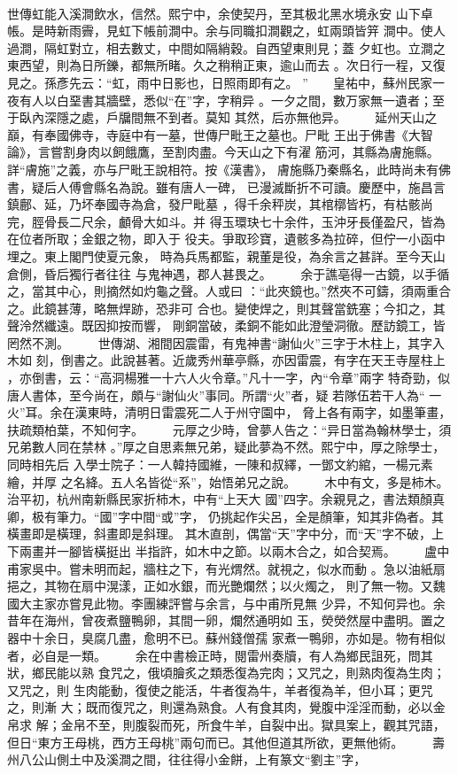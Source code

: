 \documentclass{ctexart}
\begin{document}
\paragraph{}
世傳虹能入溪澗飲水，信然。熙宁中，余使契丹，至其极北黑水境永安 山下卓帳。是時新雨霽，見虹下帳前澗中。余与同職扣澗觀之，虹兩頭皆笄 澗中。使人過澗，隔虹對立，相去數丈，中間如隔綃穀。自西望東則見；蓋 夕虹也。立澗之東西望，則為日所鑠，都無所睹。久之稍稍正東，逾山而去 。次日行一程，又復見之。孫彥先云：``虹，雨中日影也，日照雨即有之。 ''　　皇祐中，蘇州民家一夜有人以白堊書其牆壁，悉似``在''字，字稍异 。一夕之間，數万家無一遺者；至于臥內深隱之處，戶牖間無不到者。莫知 其然，后亦無他异。 　　延州天山之巔，有奉國佛寺，寺庭中有一墓，世傳尸毗王之墓也。尸毗 王出于佛書《大智論》，言嘗割身肉以飼餓鷹，至割肉盡。今天山之下有濯 筋河，其縣為膚施縣。詳``膚施''之義，亦与尸毗王說相符。按《漢書》， 膚施縣乃秦縣名，此時尚未有佛書，疑后人傅會縣名為說。雖有唐人一碑， 已漫滅斷折不可讀。慶歷中，施昌言鎮鄜、延，乃坏奉國寺為倉，發尸毗墓 ，得千余秤炭，其棺槨皆朽，有枯骸尚完，脛骨長二尺余，顱骨大如斗。并 得玉環玦七十余件，玉沖牙長僅盈尺，皆為在位者所取；金銀之物，即入于 役夫。爭取珍寶，遺骸多為拉碎，但佇一小函中埋之。東上閣門使夏元象， 時為兵馬都監，親董是役，為余言之甚詳。至今天山倉側，昏后獨行者往往 与鬼神遇，郡人甚畏之。 　　余于譙亳得一古鏡，以手循之，當其中心，則摘然如灼龜之聲。人或曰 ：``此夾鏡也。''然夾不可鑄，須兩重合之。此鏡甚薄，略無焊跡，恐非可 合也。變使焊之，則其聲當銑塞；今扣之，其聲泠然纖遠。既因抑按而響， 剛銅當破，柔銅不能如此澄瑩洞徹。歷訪鏡工，皆罔然不測。 　　世傳湖、湘間因震雷，有鬼神書``謝仙火''三字于木柱上，其字入木如 刻，倒書之。此說甚著。近歲秀州華亭縣，亦因雷震，有字在天王寺屋柱上 ，亦倒書，云：``高洞楊雅一十六人火令章。''凡十一字，內``令章''兩字 特奇勁，似唐人書体，至今尚在，頗与``謝仙火''事同。所謂``火''者，疑 若隊伍若干人為`` 一火''耳。余在漢東時，清明日雷震死二人于州守園中， 脅上各有兩字，如墨筆畫，扶疏類柏葉，不知何字。 　　元厚之少時，曾夢人告之：``异日當為翰林學士，須兄弟數人同在禁林 。''厚之自思素無兄弟，疑此夢為不然。熙宁中，厚之除學士，同時相先后 入學士院子：一人韓持國維，一陳和叔繹，一鄧文約綰，一楊元素繪，并厚 之名絳。五人名皆從``系''，始悟弟兄之說。 　　木中有文，多是柿木。治平初，杭州南新縣民家折柿木，中有``上天大 國''四字。余親見之，書法類顏真卿，极有筆力。``國''字中間``或''字， 仍挑起作尖呂，全是顏筆，知其非偽者。其橫畫即是橫理，斜畫即是斜理。 其木直剖，偶當``天''字中分，而``天''字不破，上下兩畫并一腳皆橫挺出 半指許，如木中之節。以兩木合之，如合契焉。 　　盧中甫家吳中。嘗未明而起，牆柱之下，有光煟然。就視之，似水而動 。急以油紙扇挹之，其物在扇中滉漾，正如水銀，而光艷爛然；以火燭之， 則了無一物。又魏國大主家亦嘗見此物。李團練評嘗与余言，与中甫所見無 少异，不知何异也。余昔年在海州，曾夜煮鹽鴨卵，其間一卵，爛然通明如 玉，熒熒然屋中盡明。置之器中十余日，臭腐几盡，愈明不已。蘇州錢僧孺 家煮一鴨卵，亦如是。物有相似者，必自是一類。 　　余在中書檢正時，閱雷州奏牘，有人為鄉民詛死，問其狀，鄉民能以熟 食咒之，俄頃膾炙之類悉復為完肉；又咒之，則熟肉復為生肉；又咒之，則 生肉能動，復使之能活，牛者復為牛，羊者復為羊，但小耳；更咒之，則漸 大；既而復咒之，則還為熟食。人有食其肉，覺腹中淫淫而動，必以金帛求 解；金帛不至，則腹裂而死，所食牛羊，自裂中出。獄具案上，觀其咒語， 但日``東方王母桃，西方王母桃''兩句而已。其他但道其所欲，更無他術。 　　壽州八公山側土中及溪澗之間，往往得小金餅，上有篆文``劉主''字， 
\end{document}
